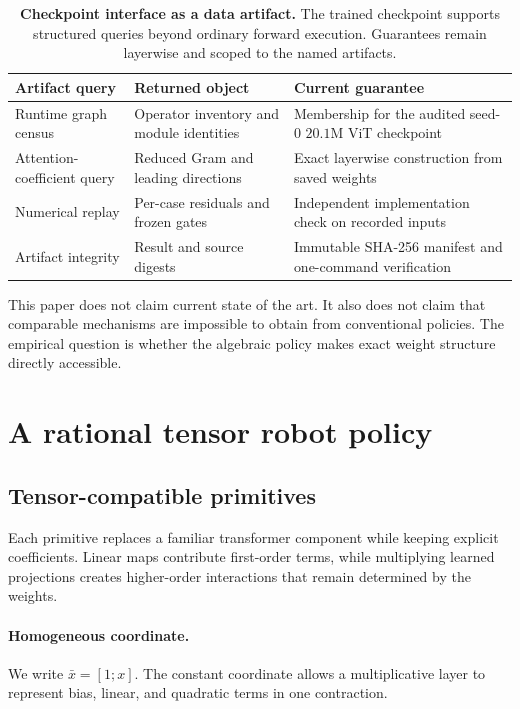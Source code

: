 \documentclass{article}
\begin{document}
\begin{table}[H]
\centering
\small
\begin{tabular}{@{}p{}p{}p{}@{}}
\toprule
Artifact query & Returned object & Current guarantee \\
\midrule
Runtime graph census & Operator inventory and module identities & Membership for the audited seed-$0$ $20.1$M ViT checkpoint \\
Attention-coefficient query & Reduced Gram and leading directions & Exact layerwise construction from saved weights \\
Numerical replay & Per-case residuals and frozen gates & Independent implementation check on recorded inputs \\
Artifact integrity & Result and source digests & Immutable SHA-256 manifest and one-command verification \\
\bottomrule
\end{tabular}
\caption{\textbf{Checkpoint interface as a data artifact.} The trained checkpoint supports
structured queries beyond ordinary forward execution. Guarantees remain layerwise and scoped to
the named artifacts.}
\label{tab:artifact-interface}
\end{table}

This paper does not claim current state of the art. It also does not claim that comparable
mechanisms are impossible to obtain from conventional policies. The empirical question is
whether the algebraic policy makes exact weight structure directly accessible.

\section{A rational tensor robot policy}
\label{sec:model}

\subsection{Tensor-compatible primitives}

Each primitive replaces a familiar transformer component while keeping explicit coefficients.
Linear maps contribute first-order terms, while multiplying learned projections creates
higher-order interactions that remain determined by the weights.

\paragraph{Homogeneous coordinate.}
We write $\bar x=[1;x]$. The constant coordinate allows a multiplicative layer to represent
bias, linear, and quadratic terms in one contraction.
\end{document}
